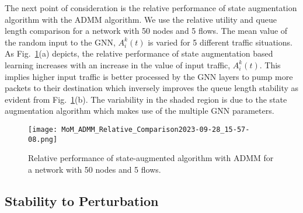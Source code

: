 \documentclass[lettersize,journal]{IEEEtran}
\begin{document}
The next point of consideration is the relative performance of state augmentation algorithm with the ADMM algorithm. We use the relative utility and queue length comparison for a network with 50 nodes and 5 flows. The mean value of the random input to the GNN, $A_i^k(t)$ is varied for 5 different traffic situations. As Fig.~\ref{Fig:rel_comp}(a) depicts, the relative performance of state augmentation based learning increases with an increase in the value of input traffic, $A_i^k(t)$. This implies higher input traffic is better processed by the GNN layers to pump more packets to their destination which inversely improves the queue length stability as evident from Fig.~\ref{Fig:rel_comp}(b). The variability in the shaded region is due to the state augmentation algorithm which makes use of the multiple GNN parameters. 
\begin{figure}[h]%
    \centering   
    \texttt{[image: MoM\_ADMM\_Relative\_Comparison2023-09-28\_15-57-08.png]}
    \caption{Relative performance of state-augmented algorithm with ADMM for a network with 50 nodes and 5 flows.}
    \label{Fig:rel_comp}
\end{figure}
\subsection{Stability to Perturbation}
\end{document}
